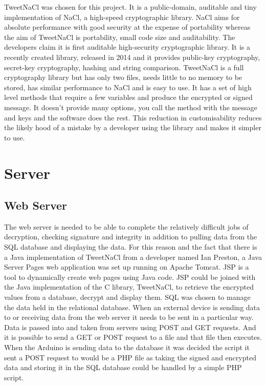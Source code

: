 
TweetNaCl was chosen for this project. It is a public-domain, auditable and tiny implementation of NaCl, a high-speed cryptographic library. NaCl aims for absolute performance with good security at the expense of portability whereas the aim of TweetNaCl is portability, small code size and auditability. The developers claim it is first auditable high-security cryptographic library. It is a recently created library, released in 2014 and it provides public-key cryptography, secret-key cryptography, hashing and string comparison. TweetNaCl is a full cryptography library but has only two files, needs little to no memory to be stored, has similar performance to NaCl and is easy to use. It has a set of high level methods that require a few variables and produce the encrypted or signed message. It doesn't provide many options, you call the method with the message and keys and the software does the rest. This reduction in customisability reduces the likely hood of a mistake by a developer using the library and makes it simpler to use.


\section{Server}

\subsection{Web Server}

The web server is needed to be able to complete the relatively difficult jobs of decryption, checking signature and integrity in addition to pulling data from the SQL database and displaying the data. For this reason and the fact that there is a Java implementation of TweetNaCl from a developer named Ian Preston, a Java Server Pages web application was set up running on Apache Tomcat. JSP is a tool to dynamically create web pages using Java code. JSP could be joined with the Java implementation of the C library, TweetNaCl, to retrieve the encrypted values from a database, decrypt and display them. SQL was chosen to manage the data held in the relational database. When an external device is sending data to or receiving data from the web server it needs to be sent in a particular way. Data is passed into and taken from servers using POST and GET requests. And it is possible to send a GET or POST request to a file and that file then executes. When the Arduino is sending data to the database it was decided the script it sent a POST request to would be a PHP file as taking the signed and encrypted data and storing it in the SQL database could be handled by a simple PHP script.

